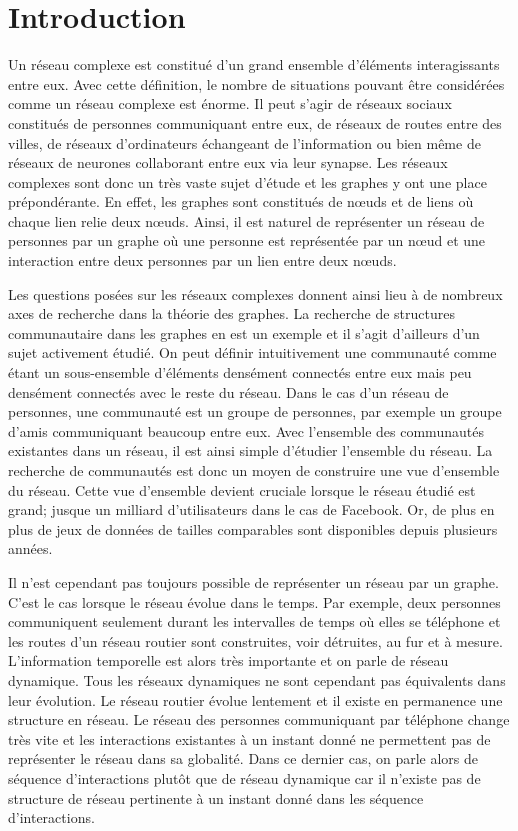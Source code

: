 
\chapter*{Introduction}

Un réseau complexe est constitué d'un grand ensemble d'éléments interagissants entre eux.
Avec cette définition, le nombre de situations pouvant être considérées comme un réseau complexe est énorme.
Il peut s'agir de réseaux sociaux constitués de personnes communiquant entre eux, de réseaux de routes entre des villes, de réseaux d'ordinateurs échangeant de l'information ou bien même de réseaux de neurones collaborant entre eux via leur synapse.
Les réseaux complexes sont donc un très vaste sujet d'étude et les graphes y ont une place prépondérante.
En effet, les graphes sont constitués de n\oe uds et de liens où chaque lien relie deux n\oe uds.
Ainsi, il est naturel de représenter un réseau de personnes par un graphe où une personne est représentée par un n\oe ud et une interaction entre deux personnes par un lien entre deux n\oe uds.

Les questions posées sur les réseaux complexes donnent ainsi lieu à de nombreux axes de recherche dans la théorie des graphes.
La recherche de structures communautaire dans les graphes en est un exemple et il s'agit d'ailleurs d'un sujet activement étudié.
On peut définir intuitivement une communauté comme étant un sous-ensemble d’éléments densément connectés entre eux mais peu densément connectés avec le reste du réseau.
Dans le cas d'un réseau de personnes, une communauté est un groupe de personnes, par exemple un groupe d'amis communiquant beaucoup entre eux.
Avec l'ensemble des communautés existantes dans un réseau, il est ainsi simple d'étudier l'ensemble du réseau.
La recherche de communautés est donc un moyen de construire une vue d'ensemble du réseau.
Cette vue d'ensemble devient cruciale lorsque le réseau étudié est grand; jusque un milliard d'utilisateurs dans le cas de Facebook.
Or, de plus en plus de jeux de données de tailles comparables sont disponibles depuis plusieurs années.


Il n'est cependant pas toujours possible de représenter un réseau par un graphe.
C'est le cas lorsque le réseau évolue dans le temps.
Par exemple, deux personnes communiquent seulement durant les intervalles de temps où elles se téléphone et les routes d'un réseau routier sont construites, voir détruites, au fur et à mesure.
L'information temporelle est alors très importante et on parle de réseau dynamique.
Tous les réseaux dynamiques ne sont cependant pas équivalents dans leur évolution.
Le réseau routier évolue lentement et il existe en permanence une structure en réseau.
Le réseau des personnes communiquant par téléphone change très vite et les interactions existantes à un instant donné ne permettent pas de représenter le réseau dans sa globalité.
Dans ce dernier cas, on parle alors de séquence d'interactions plutôt que de réseau dynamique car il n'existe pas de structure de réseau pertinente à un instant donné dans les séquence d'interactions.



